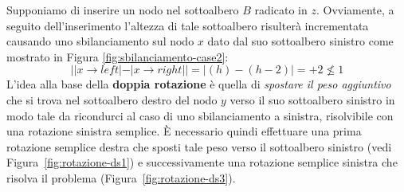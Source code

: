 \begin{center}
\begin{minipage}{.45\textwidth}
\end{minipage}
\end{center}

Supponiamo di inserire un nodo nel sottoalbero $B$ radicato in $z$. Ovviamente, a seguito dell'inserimento l'altezza di tale sottoalbero risulterà incrementata causando uno sbilanciamento sul nodo $x$ dato dal suo sottoalbero sinistro come mostrato in Figura \ref{fig:sbilanciamento-case2}:
\begin{displaymath}
||x \rightarrow left| - |x \rightarrow right|| = |(h)-(h-2)| = +2 \nleq 1
\end{displaymath}
L'idea alla base della \textbf{doppia rotazione} è quella di \textit{spostare il peso aggiuntivo} che si trova nel sottoalbero destro del nodo $y$ verso il suo sottoalbero sinistro in modo tale da ricondurci al caso di uno sbilanciamento a sinistra, risolvibile con una rotazione sinistra semplice. È necessario quindi effettuare una prima rotazione semplice destra che sposti tale peso verso il sottoalbero sinistro (vedi Figura~\ref{fig:rotazione-ds1}) e successivamente una rotazione semplice sinistra che risolva il problema (Figura~\ref{fig:rotazione-ds3}).

